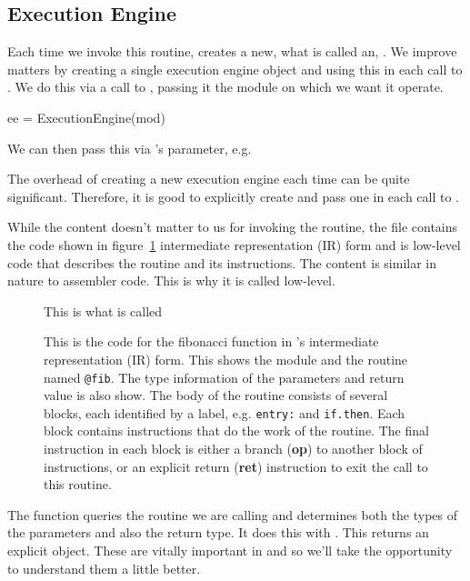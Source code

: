 \documentclass[article]{jss}
\def\Rllvm{\Rpkg{Rllvm}}
\def\Ins#1{\textbf{#1}}
\begin{document}
\subsection{Execution Engine}

Each time we invoke this routine, \Rllvm creates a new, what is called
an, . We improve matters by creating 
a single execution engine object and using this in each call
to . We do this via a call to ,
passing it the module on which we want it operate. %
\begin{RCode}
ee = ExecutionEngine(mod)  
\end{RCode}
We can then pass this via 's  parameter, e.g.
The overhead of creating a new execution engine each time can be quite
significant.  Therefore, it is good to explicitly create and pass
one in each call to . %


While the content doesn't matter to us for invoking the routine, the
 file contains the code shown in figure~\ref{fig:IRCodeDisplay}
intermediate representation (IR) form and is low-level code that
describes the routine and its instructions.  The content is similar in
nature to assembler code. This is why it is called low-level.
\begin{figure}
 This is what is called  
  \caption{This is the code for the fibonacci function
in \llvm's intermediate representation (IR) form.
This shows the module and the routine named \texttt{@fib}.
The type information of the parameters and return value is also show.
The body of the routine consists of several blocks, each identified
by a label, e.g. \texttt{entry:} and \texttt{if.then}.
Each block contains instructions that do the work of the routine.
The final instruction in each block is either a branch (\Ins{op})
to another block of instructions, or an explicit return (\Ins{ret})
instruction to exit the call to this routine.
}\label{fig:IRCodeDisplay}
\end{figure}

The  function queries the routine we are calling and
determines both the types of the parameters and also the return type.
It does this with .  This returns an explicit
 object. These are vitally important in \llvm{} and
so we'll take the opportunity to understand them a little better.
\end{document}
